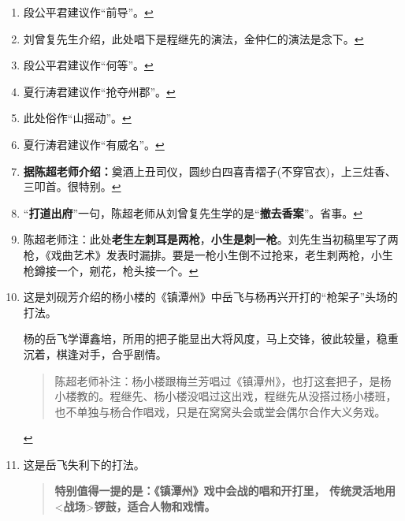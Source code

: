 \begin{enumerate}
\item
  \leavevmode\hypertarget{fn528}{}%
  段公平君建议作``前导''。\protect\hyperlink{fnref528}{↩}
\item
  \leavevmode\hypertarget{fn529}{}%
  刘曾复先生介绍，此处唱下是程继先的演法，金仲仁的演法是念下。\protect\hyperlink{fnref529}{↩}
\item
  \leavevmode\hypertarget{fn530}{}%
  段公平君建议作``何等''。\protect\hyperlink{fnref530}{↩}
\item
  \leavevmode\hypertarget{fn531}{}%
  夏行涛君建议作``抢夺州郡''。\protect\hyperlink{fnref531}{↩}
\item
  \leavevmode\hypertarget{fn532}{}%
  此处俗作``山摇动''。\protect\hyperlink{fnref532}{↩}
\item
  \leavevmode\hypertarget{fn533}{}%
  夏行涛君建议作``有威名''。\protect\hyperlink{fnref533}{↩}
\item
  \leavevmode\hypertarget{fn534}{}%
  \textbf{据陈超老师介绍：}奠酒上丑司仪，圆纱白四喜青褶子(不穿官衣)，上三炷香、三叩首。很特别。\protect\hyperlink{fnref534}{↩}
\item
  \leavevmode\hypertarget{fn535}{}%
  ``\textbf{打道出府}''一句，陈超老师从刘曾复先生学的是``\textbf{撤去香案}''。省事。\protect\hyperlink{fnref535}{↩}
\item
  \leavevmode\hypertarget{fn536}{}%
  陈超老师注：此处\textbf{老生左刺耳是两枪}，\textbf{小生是刺一枪}。刘先生当初稿里写了两枪，《戏曲艺术》发表时漏排。要是一枪小生倒不过抢来，老生刺两枪，小生枪鐏接一个，剜花，枪头接一个。\protect\hyperlink{fnref536}{↩}
\item
  \leavevmode\hypertarget{fn537}{}%
  这是刘砚芳介绍的杨小楼的《镇潭州》中岳飞与杨再兴开打的``枪架子''头场的打法。

  杨的岳飞学谭鑫培，所用的把子能显出大将风度，马上交锋，彼此较量，稳重沉着，棋逢对手，合乎剧情。

  \begin{quote}
  陈超老师补注：杨小楼跟梅兰芳唱过《镇潭州》，也打这套把子，是杨小楼教的。程继先、杨小楼没唱过这出戏，程继先从没搭过杨小楼班，也不单独与杨合作唱戏，只是在窝窝头会或堂会偶尔合作大义务戏。
  \end{quote}

  \protect\hyperlink{fnref537}{↩}
\item
  \leavevmode\hypertarget{fn538}{}%
  这是岳飞失利下的打法。

  \begin{quote}
  \textbf{特别值得一提的是：《镇潭州》戏中会战的唱和开打里，
  传统灵活地用}\textless{}\textbf{战场}\textgreater{}\textbf{锣鼓，适合人物和戏情。}
  \end{quote}


\end{enumerate}
